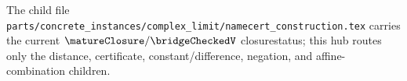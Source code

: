 The child file \texttt{parts/concrete\_instances/complex\_limit/namecert\_construction.tex} carries the current $\matureClosure/\bridgeCheckedV$ closurestatus; this hub routes only the distance, certificate, constant/difference, negation, and affine-combination children.




